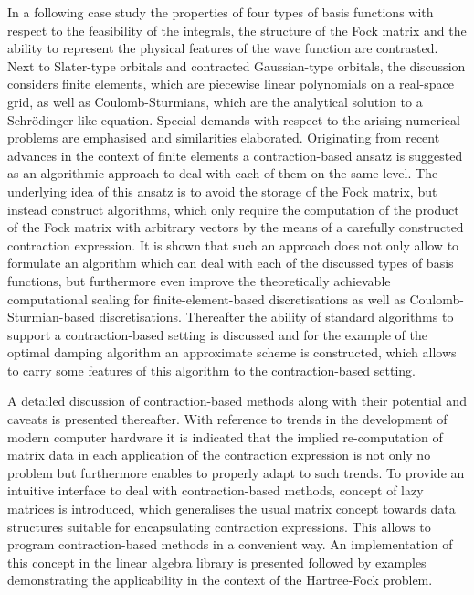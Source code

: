 In a following case study the properties of four types of basis functions
with respect to the feasibility of the integrals,
the structure of the Fock matrix
and the ability to represent the physical features of the wave function are contrasted.
Next to Slater-type orbitals and contracted Gaussian-type orbitals,
the discussion considers finite elements,
which are piecewise linear polynomials on a real-space grid,
as well as Coulomb-Sturmians,
which are the analytical solution to a Schrödinger-like equation.
Special demands with respect to the arising numerical problems
are emphasised and similarities elaborated.
Originating from recent advances in the context of finite elements
a contraction-based ansatz is suggested as an algorithmic approach
to deal with each of them on the same level.
The underlying idea of this ansatz is to avoid the storage of the Fock matrix,
but instead construct algorithms,
which only require the computation of the product of the Fock matrix with
arbitrary vectors by the means of a carefully constructed contraction expression.
It is shown that such an approach does not only allow to formulate
an \SCF algorithm which can deal with each of the discussed types
of basis functions,
but furthermore even improve the theoretically achievable
computational scaling for finite-element-based discretisations
as well as Coulomb-Sturmian-based discretisations.
Thereafter the ability of standard \SCF algorithms to support
a contraction-based setting is discussed and
for the example of the optimal damping algorithm
an approximate scheme is constructed,
which allows to carry some features of this algorithm to the
contraction-based setting.

A detailed discussion of contraction-based methods
along with their potential and caveats is presented thereafter.
With reference to trends in the development of modern computer hardware
it is indicated that the implied re-computation of matrix
data in each application of the contraction expression
is not only no problem but furthermore enables to properly adapt to such trends.
To provide an intuitive interface to deal with contraction-based methods,
concept of lazy matrices is introduced,
which generalises the usual matrix concept towards data structures
suitable for encapsulating contraction expressions.
This allows to program contraction-based
methods in a convenient way.
An implementation of this concept in the \lazyten linear algebra
library is presented followed by examples
demonstrating the applicability in the context of the Hartree-Fock problem.

